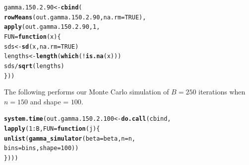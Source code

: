 \documentclass[11pt]{article}\usepackage[]{graphicx}\usepackage[]{color}
\makeatletter
\newcommand{\hlnum}[1]{\textcolor[rgb]{0.686,0.059,0.569}{#1}}%
\newcommand{\hlopt}[1]{\textcolor[rgb]{0,0,0}{#1}}%
\newcommand{\hlstd}[1]{\textcolor[rgb]{0.345,0.345,0.345}{#1}}%
\newcommand{\hlkwa}[1]{\textcolor[rgb]{0.161,0.373,0.58}{\textbf{#1}}}%
\newcommand{\hlkwb}[1]{\textcolor[rgb]{0.69,0.353,0.396}{#1}}%
\newcommand{\hlkwc}[1]{\textcolor[rgb]{0.333,0.667,0.333}{#1}}%
\newcommand{\hlkwd}[1]{\textcolor[rgb]{0.737,0.353,0.396}{\textbf{#1}}}%
\newenvironment{kframe}{%
 \def\at@end@of@kframe{}%
 \ifinner\ifhmode%
  \def\at@end@of@kframe{\end{minipage}}%
  \begin{minipage}{\columnwidth}%
 \fi\fi%
 \def\FrameCommand##1{\hskip\@totalleftmargin \hskip-\fboxsep
 \colorbox{shadecolor}{##1}\hskip-\fboxsep
     \hskip-\linewidth \hskip-\@totalleftmargin \hskip\columnwidth}%
 \MakeFramed {\advance\hsize-\width
   \@totalleftmargin\z@ \linewidth\hsize
   \@setminipage}}%
 {\par\unskip\endMakeFramed%
 \at@end@of@kframe}
\newenvironment{knitrout}{}{} %
\makeatother
\begin{document}
\begin{knitrout}
\color{fgcolor}\begin{kframe}
\begin{alltt}
\hlstd{gamma.150.2.90} \hlkwb{<-} \hlkwd{cbind}\hlstd{(}
  \hlkwd{rowMeans}\hlstd{(out.gamma.150.2.90,} \hlkwc{na.rm} \hlstd{=} \hlnum{TRUE}\hlstd{),}
  \hlkwd{apply}\hlstd{(out.gamma.150.2.90,} \hlnum{1}\hlstd{,}
  \hlkwc{FUN} \hlstd{=} \hlkwa{function}\hlstd{(}\hlkwc{x}\hlstd{)\{}
    \hlstd{sds} \hlkwb{<-} \hlkwd{sd}\hlstd{(x,} \hlkwc{na.rm} \hlstd{=} \hlnum{TRUE}\hlstd{)}
    \hlstd{lengths} \hlkwb{<-} \hlkwd{length}\hlstd{(}\hlkwd{which}\hlstd{(}\hlopt{!}\hlkwd{is.na}\hlstd{(x)))}
    \hlstd{sds} \hlopt{/} \hlkwd{sqrt}\hlstd{(lengths)}
  \hlstd{\}))}
\end{alltt}


{\ttfamily\noindent\bfseries\color{errorcolor}{\#\# Error in is.data.frame(x): object 'out.gamma.150.2.90' not found}}\end{kframe}
\end{knitrout}

The following performs our Monte Carlo simulation of $B = 250$ iterations 
when $n = 150$ and shape = $100$.

\begin{knitrout}
\color{fgcolor}\begin{kframe}
\begin{alltt}
\hlkwd{system.time}\hlstd{(out.gamma.150.2.100} \hlkwb{<-} \hlkwd{do.call}\hlstd{(cbind,}
  \hlkwd{lapply}\hlstd{(}\hlnum{1}\hlopt{:}\hlstd{B,} \hlkwc{FUN} \hlstd{=} \hlkwa{function}\hlstd{(}\hlkwc{j}\hlstd{)\{}
    \hlkwd{unlist}\hlstd{(}\hlkwd{gamma_simulator}\hlstd{(}\hlkwc{beta} \hlstd{= beta,} \hlkwc{n} \hlstd{= n,}
      \hlkwc{bins} \hlstd{= bins,} \hlkwc{shape} \hlstd{=} \hlnum{100}\hlstd{))}
\hlstd{\})))}
\end{alltt}


{\ttfamily\noindent\bfseries\color{errorcolor}{\#\# Error in eval(predvars, data, env): object 'x1' not found}}

{\ttfamily\noindent\itshape\color{messagecolor}{\#\# Timing stopped at: 0.005 0 0.005}}\end{kframe}
\end{knitrout}
\end{document}

